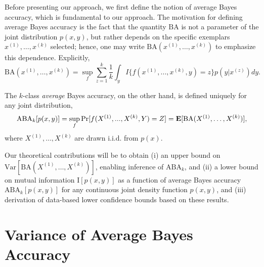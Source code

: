 \documentclass[12pt]{article}
\begin{document}
Before presenting our approach, we first define the notion of average
Bayes accuracy, which is fundamental to our approach.  The motivation
for defining average Bayes accuracy is the fact that the quantity
$\text{BA}$ is not a parameter of the joint distribution $p(x, y)$,
but rather depends on the specific exemplars $x^{(1)},\hdots, x^{(k)}$
selected; hence, one may write $\text{BA}(x^{(1)},\hdots, x^{(k)})$ to
emphasize this dependence.  Explicitly,
\[
\text{BA}(x^{(1)},\hdots, x^{(k)}) = \sup_f \sum_{z=1}^k \frac{1}{k} \int_y I\{f(x^{(1)},...,x^{(k)}, y)=z\} p(y|x^{(z)}) dy.
\]

The $k$-class \emph{average} Bayes accuracy, on the other hand, is
defined uniquely for any joint distribution,
\begin{equation}\label{eq:abe}
\text{ABA}_k[p(x,y)] = \sup_f \Pr[f(X^{(1)},...,X^{(k)}, Y) = Z] = \textbf{E}[\text{BA}(X^{(1)},\hdots, X^{(k)})],
\end{equation}
where $X^{(1)},\hdots, X^{(k)}$ are drawn i.i.d. from $p(x)$.

Our theoretical contributions will be to obtain (i) an upper bound on
$\text{Var}[\text{BA}(X^{(1)},\hdots,X^{(k)})]$, enabling inference of
$\text{ABA}_k$, and (ii) a lower bound on mutual information
$\text{I}[p(x,y)]$ as a function of average Bayes accuracy
$\text{ABA}_k[p(x,y)]$ for any continuous joint density function
$p(x,y)$, and (iii) derivation of data-based lower confidence bounds
based on these results.

\section{Variance of Average Bayes Accuracy}
\end{document}
